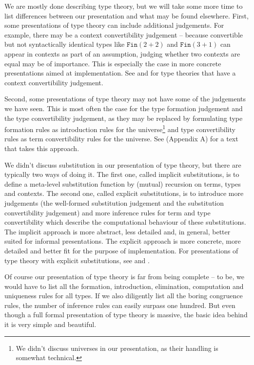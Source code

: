 \documentclass[declaration,mgr,english,shortabstract]{iithesis}
\newcommand{\m}[1]{\texttt{#1}}
\newcommand{\Fin}[1]{\m{Fin}(#1)}
\begin{document}
We are mostly done describing type theory, but we will take some more time to list differences between our presentation and what may be found elsewhere. First, some presentations of type theory can include additional judgements. For example, there may be a context convertibility judgement -- because convertible but not syntactically identical types like $\Fin{2 + 2}$ and $\Fin{3 + 1}$ can appear in contexts as part of an assumption, judging whether two contexts are equal may be of importance. This is especially the case in more concrete presentations aimed at implementation. See \cite{Danielsson} and \cite{EatItself} for type theories that have a context convertibility judgement.

Second, some presentations of type theory may not have some of the judgements we have seen. This is most often the case for the type formation judgement and the type convertibility judgement, as they may be replaced by formulating type formation rules as introduction rules for the universe\footnote{We didn't discuss universes in our presentation, as their handling is somewhat technical.} and type convertibility rules as term convertibility rules for the universe. See \cite{HoTTBook} (Appendix A) for a text that takes this approach.

We didn't discuss substitution in our presentation of type theory, but there are typically two ways of doing it. The first one, called implicit substitutions, is to define a meta-level substitution function by (mutual) recursion on terms, types and contexts. The second one, called explicit substitutions, is to introduce more judgements (the well-formed substitution judgement and the substitution convertibility judgement) and more inference rules for term and type convertibility which describe the computational behaviour of these substitutions. The implicit approach is more abstract, less detailed and, in general, better suited for informal presentations. The explicit approach is more concrete, more detailed and better fit for the purpose of implementation. For presentations of type theory with explicit substitutions, see \cite{Danielsson} and \cite{EatItself}.

Of course our presentation of type theory is far from being complete -- to be, we would have to list all the formation, introduction, elimination, computation and uniqueness rules for all types. If we also diligently list all the boring congruence rules, the number of inference rules can easily surpass one hundred. But even though a full formal presentation of type theory is massive, the basic idea behind it is very simple and beautiful.
\end{document}

